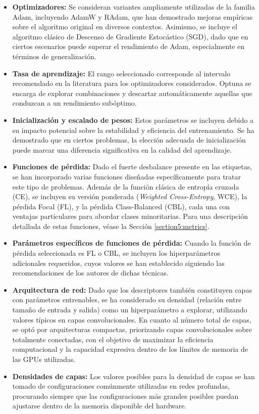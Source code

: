 \begin{itemize}
    \item \textbf{Optimizadores:} Se consideran variantes ampliamente utilizadas de la familia Adam, incluyendo AdamW y RAdam, que han demostrado mejoras empíricas sobre el algoritmo original en diversos contextos. Asimismo, se incluye el algoritmo clásico de Descenso de Gradiente Estocástico (SGD), dado que en ciertos escenarios puede superar el rendimiento de Adam, especialmente en términos de generalización.
    \item \textbf{Tasa de aprendizaje:} El rango seleccionado corresponde al intervalo recomendado en la literatura para los optimizadores considerados. Optuna se encarga de explorar combinaciones y descartar automáticamente aquellas que conduzcan a un rendimiento subóptimo. 
    \item \textbf{Inicialización y escalado de pesos:} Estos parámetros se incluyen debido a su impacto potencial sobre la estabilidad y eficiencia del entrenamiento. Se ha demostrado que en ciertos problemas, la elección adecuada de inicialización puede marcar una diferencia significativa en la calidad del aprendizaje.
    \item \textbf{Funciones de pérdida:} Dado el fuerte desbalance presente en las etiquetas, se han incorporado varias funciones diseñadas específicamente para tratar este tipo de problemas. Además de la función clásica de entropía cruzada (CE), se incluyen su versión ponderada (\textit{Weighted Cross-Entropy}, WCE), la pérdida Focal (FL), y la pérdida Class-Balanced (CBL), cada una con ventajas particulares para abordar clases minoritarias. Para una descripción detallada de estas funciones, véase la Sección \ref{section5:metrics}.
    \item \textbf{Parámetros específicos de funciones de pérdida:} Cuando la función de pérdida seleccionada es FL o CBL, se incluyen los hiperparámetros adicionales requeridos, cuyos valores se han establecido siguiendo las recomendaciones de los autores de dichas técnicas.
    \item \textbf{Arquitectura de red:} Dado que los descriptores también constituyen capas con parámetros entrenables, se ha considerado su densidad (relación entre tamaño de entrada y salida) como un hiperparámetro a explorar, utilizando valores típicos en capas convolucionales. En cuanto al número total de capas, se optó por arquitecturas compactas, priorizando capas convolucionales sobre totalmente conectadas, con el objetivo de maximizar la eficiencia computacional y la capacidad expresiva dentro de los límites de memoria de las GPUs utilizadas.
    \item \textbf{Densidades de capas:} Los valores posibles para la densidad de capas se han tomado de configuraciones comúnmente utilizadas en redes profundas, procurando siempre que las configuraciones más grandes posibles puedan ajustarse dentro de la memoria disponible del hardware.
\end{itemize}

